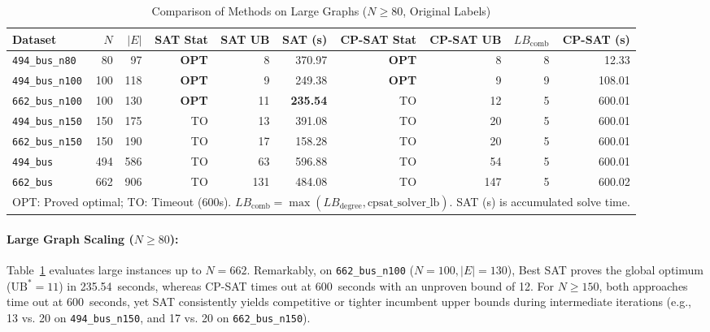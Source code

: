 \documentclass[a4paper,fleqn]{cas-sc}
\begin{document}
\begin{table}
\centering
\footnotesize
\setlength{\tabcolsep}{4.5pt}
\caption{Comparison of Methods on Large Graphs ($N \ge 80$, Original Labels)}
\label{tab:table_methods_large}
\begin{tabular}{lrrrrrrrrr}
\toprule
Dataset & $N$ & $|E|$ & SAT Stat & SAT UB & SAT (s) & CP-SAT Stat & CP-SAT UB & $LB_{\text{comb}}$ & CP-SAT (s) \\
\midrule
\texttt{494\_bus\_n80} & 80 & 97 & \textbf{OPT} & 8 & 370.97 & \textbf{OPT} & 8 & 8 & 12.33 \\
\texttt{494\_bus\_n100} & 100 & 118 & \textbf{OPT} & 9 & 249.38 & \textbf{OPT} & 9 & 9 & 108.01 \\
\texttt{662\_bus\_n100} & 100 & 130 & \textbf{OPT} & 11 & \textbf{235.54} & TO & 12 & 5 & 600.01 \\
\texttt{494\_bus\_n150} & 150 & 175 & TO & 13 & 391.08 & TO & 20 & 5 & 600.01 \\
\texttt{662\_bus\_n150} & 150 & 190 & TO & 17 & 158.28 & TO & 20 & 5 & 600.01 \\
\texttt{494\_bus} & 494 & 586 & TO & 63 & 596.88 & TO & 54 & 5 & 600.01 \\
\texttt{662\_bus} & 662 & 906 & TO & 131 & 484.08 & TO & 147 & 5 & 600.02 \\
\bottomrule
\multicolumn{10}{l}{\footnotesize OPT: Proved optimal; TO: Timeout (600s). $LB_{\text{comb}} = \max(LB_{\text{degree}}, \text{cpsat\_solver\_lb})$. SAT (s) is accumulated solve time.} \\
\end{tabular}
\end{table}

\paragraph{Large Graph Scaling ($N \ge 80$):}
Table~\ref{tab:table_methods_large} evaluates large instances up to $N=662$. Remarkably, on \texttt{662\_bus\_n100} ($N=100, |E|=130$), Best SAT proves the global optimum ($\text{UB}^* = 11$) in 235.54~seconds, whereas CP-SAT times out at 600~seconds with an unproven bound of 12. For $N \ge 150$, both approaches time out at 600~seconds, yet SAT consistently yields competitive or tighter incumbent upper bounds during intermediate iterations (e.g., 13 vs. 20 on \texttt{494\_bus\_n150}, and 17 vs. 20 on \texttt{662\_bus\_n150}).
\end{document}
